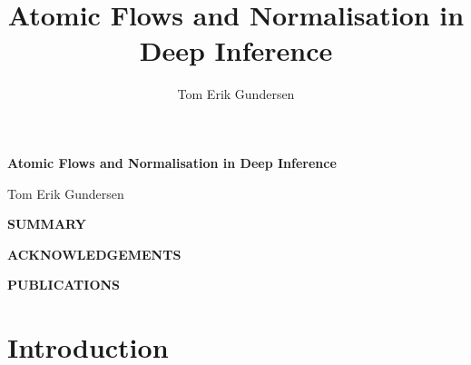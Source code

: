 \documentclass[11pt]{report}
\author{Tom Erik Gundersen}
\title{Atomic Flows and Normalisation in Deep Inference}
\begin{document}
%
%

\renewcommand{\thepage}{\roman{page}}
\maketitle

\clearpage
\thispagestyle{plain}
{\begin{center}
\vspace*{1.7cm}
{\def\baselinestretch{1.2}\Huge\bf Atomic Flows and Normalisation in Deep Inference \par}
\vspace{4cm}
{\begin{center}{\huge Tom Erik Gundersen }\end{center}}
\end{center}}

\clearpage
\thispagestyle{plain}
\begin{center}
\vspace{20pt}
  \Large\bfseries{SUMMARY}
\end{center}
%

\clearpage
\thispagestyle{plain}
\begin{center}
  {\Large\bfseries{ACKNOWLEDGEMENTS}}
\end{center}
%

\clearpage
\thispagestyle{plain}
\begin{center}
  {\Large\bfseries{PUBLICATIONS}}
\end{center}
\begin{flushleft}
%
\end{flushleft}



{
\tableofcontents 
}
\newpage
{}
\part{Introduction}
%
%
%
%
%
%
%
%
\end{document}
